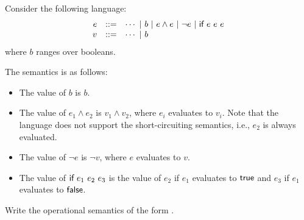 \begin{exercise}

Consider the following language:
\[
\begin{array}{rrl}
  e & ::= & \cdots\ |\ b\ |\ e\wedge e\ |\ \neg e\ |\ \eif{e}{e}{e} \\
  v & ::= & \cdots\ |\ b \\
\end{array}
\]
where $b$ ranges over booleans.

The semantics is as follows:
\begin{itemize}
  \item The value of $b$ is $b$.
  \item
The value of $e_1\wedge e_2$ is $v_1\wedge v_2$,
where $e_i$ evaluates to $v_i$.
Note that the language does not support the short-circuiting
semantics, i.e., $e_2$ is always evaluated.
  \item
The value of $\neg e$ is $\neg v$, where $e$ evaluates to $v$.
  \item
    The value of $\textsf{if}\ e_1\ e_2\ e_3$ is the value of $e_2$ if $e_1$ evaluates
    to $\textsf{true}$ and $e_3$ if $e_1$ evaluates to $\textsf{false}$.
\end{itemize}
Write the operational semantics of the form .

\end{exercise}

